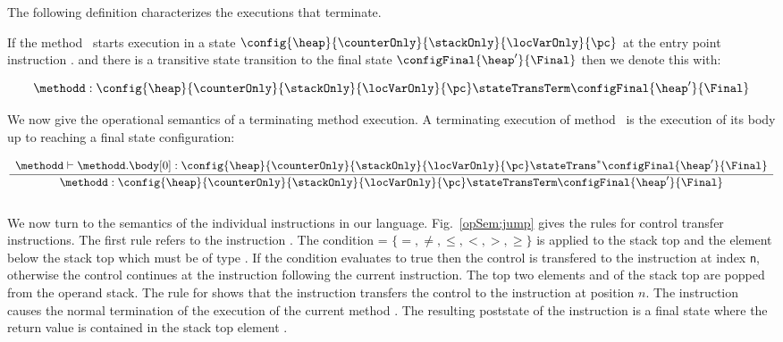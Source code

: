 The following definition characterizes the executions that terminate. 


 \begin{transClosStateTrans1} \label{stateTransClos}
   If  the method \methodd \  starts execution in a state $\config{ \heap}{\counterOnly}{\stackOnly}{\locVarOnly}{\pc}$   
   at the entry point instruction \mbox{\rm\methodd.\body[0]} 
   and there is a transitive state transition to the final state $\configFinal{ \heap'}{\Final}$ then   we denote this  with: 

    $$  \methodd : \config{ \heap}{\counterOnly}{\stackOnly}{\locVarOnly}{ \pc } \stateTransTerm \configFinal{ \heap'}{\Final} $$
 \end{transClosStateTrans1}
 



 We now give the operational semantics of a terminating method execution. A terminating execution of method \methodd \
 is the execution of its body up to reaching a final state configuration:
 
 $$
\frac{\begin{array}{l}
          \methodd \vdash  \methodd.\body[0] :  
	                    \config{\heap}{\counterOnly}{\stackOnly}{\locVarOnly}{\pc}  \stateTrans^{*} \configFinal{\heap'}{\Final}\\
	\end{array}	 
       }
       {\methodd :  \config{\heap}{\counterOnly}{\stackOnly}{\locVarOnly}{\pc} 
		    \stateTransTerm
                   \configFinal{\heap'} {\Final} }
$$ \\


 

   

We now turn to the semantics of the individual instructions in our language. 
 Fig.\ \ref{opSem:jump} gives the rules for control transfer instructions. The first rule refers to
the instruction \ifCond. The condition \rel = $\{ =, \neq, \le, <, >, \ge \} $ is applied to the stack top  \stackOnlyParam{\counterOnly} and the element below the stack top 
\stackOnlyParam{\counterOnly -1} which must be of type \Myint. If the condition evaluates to true then the control is transfered to the instruction
  at index \texttt{n}, otherwise the control continues at the instruction following the current instruction. The top two elements \stackOnlyParam{\counterOnly} and
 \stackOnlyParam{\counterOnly - 1}  of the stack top are popped from the operand stack. The rule for \goto{} shows that the instruction
 transfers the control to the instruction at position $n$.   
 The instruction \return{} causes the normal termination of the execution of the current method \methodd.
 The resulting poststate of the  instruction is a final state where the return value is contained in  
 the stack top element \stackOnlyParam{\counterOnly}.


